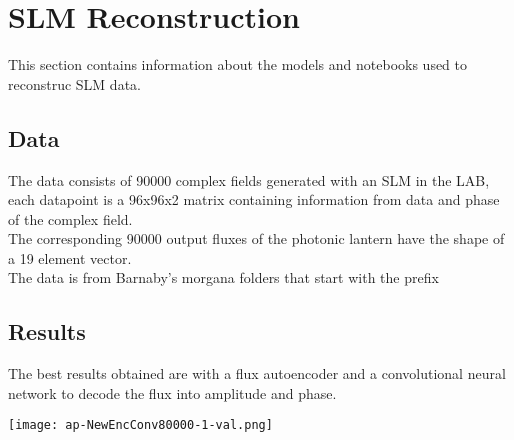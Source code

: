\section{SLM Reconstruction}
    This section contains information about the models and notebooks used to reconstruc SLM data.
    
	\subsection{Data}
		The data consists of 90000 complex fields generated with an SLM in the LAB, each datapoint is a 96x96x2 matrix containing information from data and phase of the complex field.\\
		
		The corresponding 90000 output fluxes of the photonic lantern have the shape of a 19 element vector.\\
		
		The data is from Barnaby's morgana folders that start with the prefix \\ 
	
	\subsection{Results}
		The best results obtained are with a flux autoencoder and a convolutional neural network to decode the flux into amplitude and phase.
		
		\begin{figure*}[ht!]
			\centering
			\texttt{[image: ap-NewEncConv80000-1-val.png]}
		\end{figure*}
		\FloatBarrier
		
